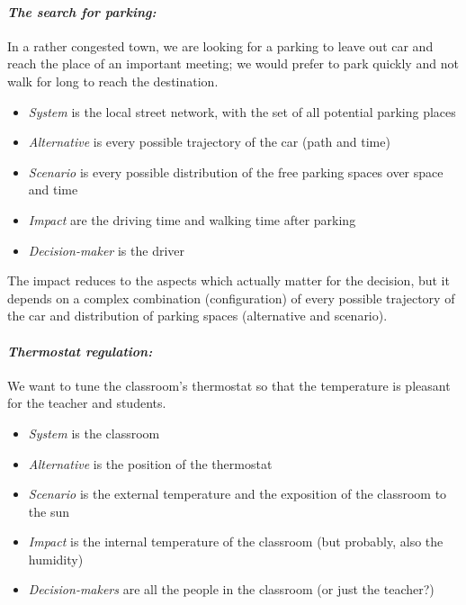 \paragraph{\textit{The search for parking:}} In a rather congested town, we are looking for a parking to leave out car and reach the place of an important meeting; we would prefer to park quickly  and not walk for long to reach the destination.
\begin{itemize}
	\item \textit{System} is the local street network, with the set of all potential parking places
	
	\item \textit{Alternative} is every possible trajectory of the car (path and time)
	
	\item \textit{Scenario} is every possible distribution of the free parking spaces over space and time
	
	\item \textit{Impact} are the driving time and walking time after parking
	
	\item \textit{Decision-maker} is the driver
\end{itemize}

The impact reduces to the aspects which actually matter for the decision, but it depends on a complex combination (configuration) of every possible trajectory of the car and distribution of parking spaces (alternative and scenario).

\paragraph{\textit{Thermostat regulation:}} We want to tune the classroom's thermostat so that the temperature is pleasant for the teacher and students.
\begin{itemize}
	\item \textit{System} is the classroom
	
	\item \textit{Alternative} is the position of the thermostat
	
	\item \textit{Scenario} is the external temperature and the exposition of the classroom to the sun 
	
	\item \textit{Impact} is the internal temperature of the classroom (but probably, also the humidity)
	
	\item \textit{Decision-makers} are all the people in the classroom (or just the teacher?)
\end{itemize}


